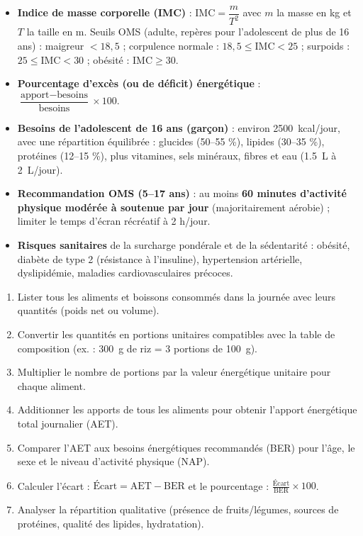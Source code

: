\documentclass[11pt]{article}
\begin{document}
\begin{aretenir}
\begin{itemize}
\item \textbf{Indice de masse corporelle (IMC)} : $\mathrm{IMC} = \dfrac{m}{T^2}$ avec $m$ la masse en kg et $T$ la taille en m. Seuils OMS (adulte, repères pour l'adolescent de plus de 16 ans) : maigreur $< 18,5$ ; corpulence normale : $18,5 \leq \mathrm{IMC} < 25$ ; surpoids : $25 \leq \mathrm{IMC} < 30$ ; obésité : $\mathrm{IMC} \geq 30$.
\item \textbf{Pourcentage d'excès (ou de déficit) énergétique} : $\dfrac{\text{apport} - \text{besoins}}{\text{besoins}} \times 100$.
\item \textbf{Besoins de l'adolescent de 16 ans (garçon)} : environ \SI{2500}{kcal/jour}, avec une répartition équilibrée : glucides (50--55 \%), lipides (30--35 \%), protéines (12--15 \%), plus vitamines, sels minéraux, fibres et eau (\SI{1,5}{L} à \SI{2}{L}/jour).
\item \textbf{Recommandation OMS (5--17 ans)} : au moins \textbf{60 minutes d'activité physique modérée à soutenue par jour} (majoritairement aérobie) ; limiter le temps d'écran récréatif à 2 h/jour.
\item \textbf{Risques sanitaires} de la surcharge pondérale et de la sédentarité : obésité, diabète de type 2 (résistance à l'insuline), hypertension artérielle, dyslipidémie, maladies cardiovasculaires précoces.
\end{itemize}
\end{aretenir}

\begin{methode}
\begin{enumerate}
\item Lister tous les aliments et boissons consommés dans la journée avec leurs quantités (poids net ou volume).
\item Convertir les quantités en portions unitaires compatibles avec la table de composition (ex. : \SI{300}{g} de riz = 3 portions de \SI{100}{g}).
\item Multiplier le nombre de portions par la valeur énergétique unitaire pour chaque aliment.
\item Additionner les apports de tous les aliments pour obtenir l'apport énergétique total journalier (AET).
\item Comparer l'AET aux besoins énergétiques recommandés (BER) pour l'âge, le sexe et le niveau d'activité physique (NAP).
\item Calculer l'écart : $\text{Écart} = \text{AET} - \text{BER}$ et le pourcentage : $\frac{\text{Écart}}{\text{BER}} \times 100$.
\item Analyser la répartition qualitative (présence de fruits/légumes, sources de protéines, qualité des lipides, hydratation).
\end{enumerate}
\end{methode}
\end{document}
